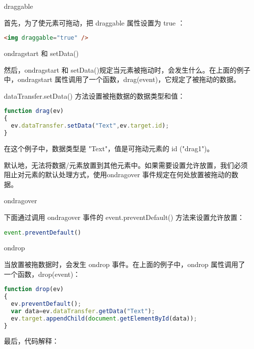 \begin{compactenum}
\item draggable



首先，为了使元素可拖动，把 draggable 属性设置为 true ：

\begin{lstlisting}[language=HTML]
<img draggable="true" />
\end{lstlisting}


\item ondragstart 和 setData()


然后，ondragstart 和 setData()规定当元素被拖动时，会发生什么。在上面的例子中，ondragstart 属性调用了一个函数，drag(event)，它规定了被拖动的数据。

dataTransfer.setData() 方法设置被拖数据的数据类型和值：



\begin{lstlisting}[language=JavaScript]
function drag(ev)
{
  ev.dataTransfer.setData("Text",ev.target.id);
}
\end{lstlisting}


在这个例子中，数据类型是 "Text"，值是可拖动元素的 id ("drag1")。

默认地，无法将数据/元素放置到其他元素中。如果需要设置允许放置，我们必须阻止对元素的默认处理方式，使用ondragover 事件规定在何处放置被拖动的数据。

\item ondragover

下面通过调用 ondragover 事件的 event.preventDefault() 方法来设置允许放置：


\begin{lstlisting}[language=JavaScript]
event.preventDefault()
\end{lstlisting}

\item ondrop

当放置被拖数据时，会发生 ondrop 事件。在上面的例子中，ondrop 属性调用了一个函数，drop(event)：

\begin{lstlisting}[language=JavaScript]
function drop(ev)
{
  ev.preventDefault();
  var data=ev.dataTransfer.getData("Text");
  ev.target.appendChild(document.getElementById(data));
}
\end{lstlisting}


\end{compactenum}

最后，代码解释：

